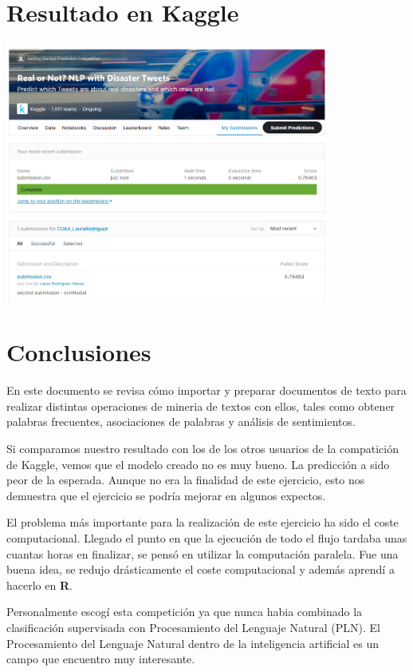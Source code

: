 \documentclass[]{article}
\begin{document}
\hypertarget{resultado-en-kaggle}{%
\section{Resultado en Kaggle}\label{resultado-en-kaggle}}

\includegraphics[width=0.8\textwidth,height=\textheight]{submission.png}

\hypertarget{conclusiones}{%
\section{Conclusiones}\label{conclusiones}}

En este documento se revisa cómo importar y preparar documentos de texto
para realizar distintas operaciones de mineria de textos con ellos,
tales como obtener palabras frecuentes, asociaciones de palabras y
análisis de sentimientos.

Si comparamos nuestro resultado con los de los otros usuarios de la
compatición de Kaggle, vemos que el modelo creado no es muy bueno. La
predicción a sido peor de la esperada. Aunque no era la finalidad de
este ejercicio, esto nos demuestra que el ejercicio se podría mejorar en
algunos expectos.

El problema más importante para la realización de este ejercicio ha sido
el coste computacional. Llegado el punto en que la ejecución de todo el
flujo tardaba unas cuantas horas en finalizar, se pensó en utilizar la
computación paralela. Fue una buena idea, se redujo drásticamente el
coste computacional y además aprendí a hacerlo en \textbf{R}.

Personalmente escogí esta competición ya que nunca habia combinado la
clasificación supervisada con Procesamiento del Lenguaje Natural (PLN).
El Procesamiento del Lenguaje Natural dentro de la inteligencia
artificial es un campo que encuentro muy interesante.
\end{document}
